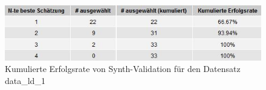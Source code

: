 \documentclass[12pt,a4paper,twoside]{scrartcl}
\numberwithin{equation}{section}
\newcounter{mypagecount}%
\newenvironment{interlude}{%
  \clearpage
  \setcounter{mypagecount}{\value{page}}%
  \thispagestyle{empty}%
  \pagestyle{empty}%
}{%
  \clearpage
  \setcounter{page}{\value{mypagecount}}%
}
\begin{document}
\begin{interlude}
\begin{appendices}
\begin{center}
\begin{figure}[H]
    \centering
    \includegraphics[height=0.2\textwidth, width=1\textwidth]{figures/plots/appendix/generatedDataLD1Grid.jpeg}
    \vspace{1mm}
    \caption[Kumulierte Erfolgsrate von Synth-Validation für den Datensatz data\_ld\_1]{Kumulierte Erfolgsrate von Synth-Validation für den Datensatz data\_ld\_1}
  \end{figure}
\end{center}

\clearpage
\end{appendices}

\clearpage
{}



\end{interlude}
\end{document}
